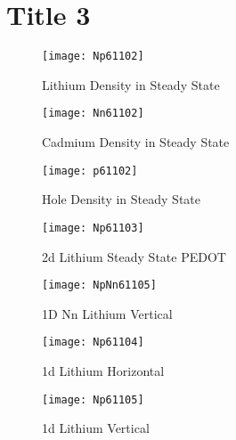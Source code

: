 \chapter{Title 3} %

\begin{landscape}
\begin{figure}[!htp]
\centering
\texttt{[image: Np61102]}
\caption{Lithium Density in Steady State} 
\label{Np61102}
\end{figure}
\end{landscape}
 

\begin{landscape}
\begin{figure}[!htp]
\centering
\texttt{[image: Nn61102]}
\caption{Cadmium Density in Steady State} 
\end{figure}
\end{landscape}


\begin{landscape}
\begin{figure}[!htp]
\centering
\texttt{[image: p61102]}
\caption{Hole Density in Steady State} 
\end{figure}
\end{landscape}

\begin{landscape}
\begin{figure}[!htp]
\centering
\texttt{[image: Np61103]}
\caption{2d Lithium Steady State PEDOT} 
\end{figure}
\end{landscape}

\begin{landscape}
\begin{figure}[!htp]
\centering
\texttt{[image: NpNn61105]}
\caption{1D Nn Lithium Vertical} 
\end{figure}
\end{landscape}

\begin{landscape}
\begin{figure}[!htp]
\centering
\texttt{[image: Np61104]}
\caption{1d Lithium Horizontal} 
\end{figure}
\end{landscape}

\begin{landscape}
\begin{figure}[!htp]
\centering
\texttt{[image: Np61105]}
\caption{1d Lithium Vertical} 
\end{figure}
\end{landscape}


